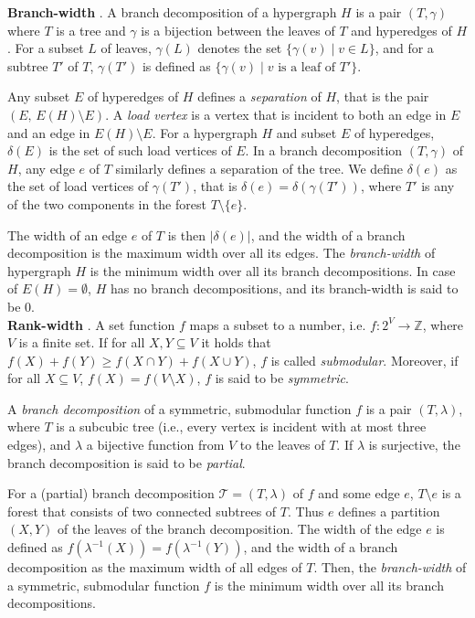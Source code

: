 \documentclass{article}
\begin{document}
\noindent
\textbf{Branch-width} \cite{DBLP:journals/tocl/LodhaOS19}.
A branch decomposition of a hypergraph $H$ is a pair $(T, \gamma)$ where $T$ is a tree and $\gamma$ is a bijection between the leaves of $T$ and hyperedges of $H$.
For a subset $L$ of leaves, $\gamma(L)$ denotes the set $\{ \gamma(v) \; | \; v \in L \}$, and for a subtree $T'$ of $T$, $\gamma(T')$ is defined as $\{ \gamma(v) \; | \; v  \text{ is a leaf of } T' \}$.

Any subset $E$ of hyperedges of $H$ defines a {\em separation} of $H$, that is the pair $(E,\, E(H) \setminus E)$.
A {\em load vertex} is a vertex that is incident to both an edge in $E$ and an edge in $E(H) \setminus E$.
For a hypergraph $H$ and subset $E$ of hyperedges, $\delta(E)$ is the set of such load vertices of $E$.
In a branch decomposition $(T, \gamma)$ of $H$, any edge $e$ of $T$ similarly defines a separation of the tree. 
We define $\delta(e)$ as the set of load vertices of $\gamma(T')$, that is $\delta(e) = \delta(\gamma(T'))$, where $T'$ is any of the two components in the forest $T \setminus \{e\}$.

The width of an edge $e$ of $T$ is then $|\delta(e)|$, and the width of a branch decomposition is the maximum width over all its edges.
The {\em branch-width} of hypergraph $H$ is the minimum width over all its branch decompositions. In case of $E(H) = \emptyset$, $H$ has no branch decompositions, and its branch-width is said to be 0. \\

\noindent
\textbf{Rank-width} \cite{DBLP:journals/fuin/GanianHO13}.
A set function $f$ maps a subset to a number, i.e. $f : 2^V \rightarrow \mathbb{Z}$, where $V$ is a finite set.
If for all $X,Y \subseteq V$ it holds that $f(X)+f(Y) \geq f(X\cap Y) + f(X\cup Y)$, $f$ is called {\em submodular}.
Moreover, if for all $X\subseteq V$, $f(X) = f(V \setminus X)$, $f$ is said to be {\em symmetric}.

A {\em branch decomposition} of a symmetric, submodular function $f$ is a pair $(T, \lambda)$, where $T$ is a subcubic tree (i.e., every vertex is incident with at most three edges), and $\lambda$ a bijective function from $V$ to the leaves of $T$.
If $\lambda$ is surjective, the branch decomposition is said to be {\em partial}.

For a (partial) branch decomposition $\mathcal{T} = (T,\lambda)$ of $f$ and some edge $e$, $T \setminus e$ is a forest that consists of two connected subtrees of $T$.
Thus $e$ defines a partition $(X,Y)$ of the leaves of the branch decomposition.
The width of the edge $e$ is defined as $f(\lambda^{-1}(X)) = f(\lambda^{-1}(Y))$, and the width of a branch decomposition as the maximum width of all edges of $T$.
Then, the {\em branch-width} of a symmetric, submodular function $f$ is the minimum width over all its branch decompositions.
\end{document}
